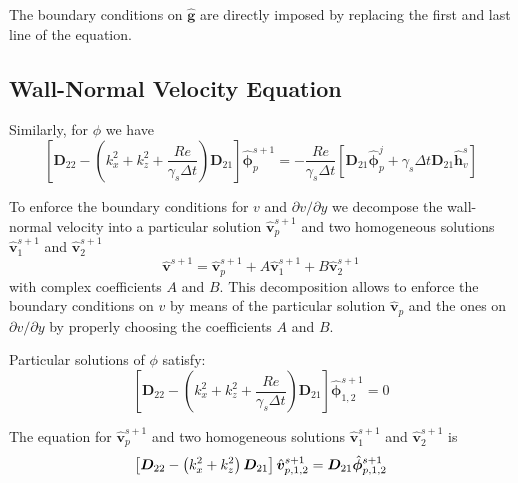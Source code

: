 \documentclass[titlepage,12pt,letter]{article}
\newcommand{\bracket}[1]{\left[ #1 \right]}
\newcommand{\re}{Re}
\numberwithin{equation}{section}
\begin{document}
The boundary conditions on $\hat{\bm{g}}$ are directly imposed by replacing the first and last line of the equation.

\subsection{Wall-Normal Velocity Equation}
Similarly, for $\phi$ we have
\begin{equation}
	\bracket{\bm{D}_{22}-\left(k_x^{2}+k_z^{2}+\frac{\re}{\gamma_{s} \Delta t}\right) \bm{D}_{21}} \hat{\bm{\phi}}_p^{s+1}=-\frac{\re}{\gamma_{s} \Delta t} \bracket{ \bm{D}_{21} \hat{\bm{\phi}}_p^{j}+\gamma_{s} \Delta t \bm{D}_{21} \hat{\bm{h}}_{v}^{s} }
\end{equation}

To enforce the boundary conditions for $v$ and $\partial v / \partial y$ we decompose the wall-normal velocity into a particular solution $\hat{\bm{v}}_{p}^{s+1}$ and two homogeneous solutions $\hat{\bm{v}}_{1}^{s+1}$ and $\hat{\bm{v}}_{2}^{s+1}$
\begin{equation*}
\hat{\bm{v}}^{s+1}=\hat{\bm{v}}_{p}^{s+1}+A \hat{\bm{v}}_{1}^{s+1}+B \hat{\bm{v}}_{2}^{s+1}
\end{equation*}
with complex coefficients $A$ and $B$. This decomposition allows to enforce the boundary conditions on $v$ by means of the particular solution $\hat{\bm{v}}_{p}$ and the ones on $\partial v / \partial y$ by properly choosing the coefficients $A$ and $B$. 

Particular solutions of $\phi$ satisfy:
\begin{equation}
	\bracket{\bm{D}_{22}-\left(k_x^{2}+k_z^{2}+\frac{\re}{\gamma_{s} \Delta t}\right) \bm{D}_{21}} \hat{\bm{\phi}}_{1,2}^{s+1}=0
\end{equation}


The equation for  $\hat{\bm{v}}_{p}^{s+1}$ and two homogeneous solutions $\hat{\bm{v}}_{1}^{s+1}$ and $\hat{\bm{v}}_{2}^{s+1}$ is
\begin{equation}
		\bracket{\bm{D}_{22}-\left(k_x^{2}+k_z^{2}\right) \bm{D}_{21}} \hat{\bm{v}}_{p,1,2}^{s+1}=\bm{D}_{21} \hat{\bm{\phi}}_{p,1,2}^{s+1} \\
\end{equation}
\end{document}
